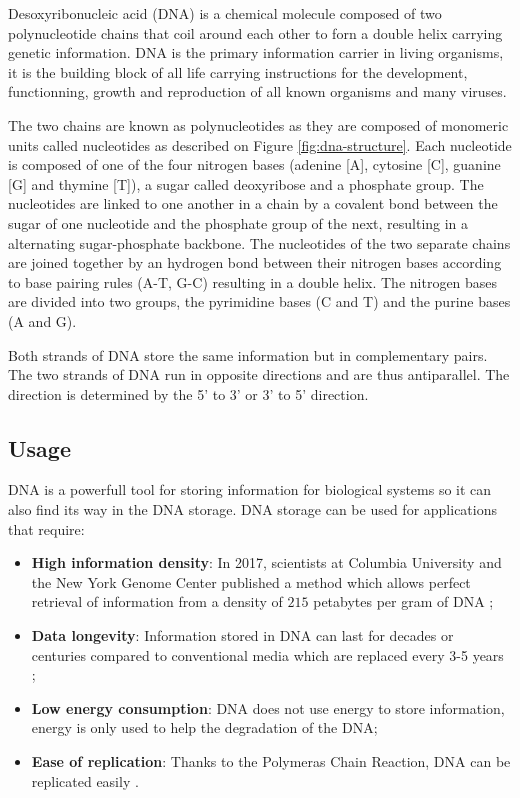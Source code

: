 Desoxyribonucleic acid (DNA) is a chemical molecule composed of two polynucleotide chains that coil around each other to forn a double helix carrying genetic information. DNA is the primary information carrier in living organisms, it is the building block of all life carrying instructions for the development, functionning, growth and reproduction of all known organisms and many viruses. 

The two chains are known as polynucleotides as they are composed of monomeric units called nucleotides as described on Figure \ref{fig:dna-structure}.
Each nucleotide is composed of one of the four nitrogen bases (adenine [A], cytosine [C], guanine [G] and thymine [T]), a sugar called deoxyribose and a phosphate group.
The nucleotides are linked to one another in a chain by a covalent bond between the sugar of one nucleotide and the phosphate group of the next, resulting in a alternating sugar-phosphate backbone.
The nucleotides of the two separate chains are joined together by an hydrogen bond between their nitrogen bases according to base pairing rules (A-T, G-C) resulting in a double helix.
The nitrogen bases are divided into two groups, the pyrimidine bases (C and T) and the purine bases (A and G).

Both strands of DNA store the same information but in complementary pairs. The two strands of DNA run in opposite directions and are thus antiparallel. The direction is determined by the 5' to 3' or 3' to 5' direction.

\subsection{Usage}

DNA is a powerfull tool for storing information for biological systems so it can also find its way in the DNA storage.
DNA storage can be used for applications that require:

\begin{itemize}
    \item \textbf{High information density}:
In 2017, scientists at Columbia University and the New York Genome Center published a method which allows perfect retrieval of information from a density of $215$ petabytes per gram of DNA \cite{bib:erlich_yaniv_2017_889697};
    \item \textbf{Data longevity}: Information stored in DNA can last for decades or centuries compared to conventional media which are replaced every 3-5 years \cite{bib:33649304};
    \item \textbf{Low energy consumption}: DNA does not use energy to store information, energy is only used to help the degradation of the DNA;
    \item \textbf{Ease of replication}: Thanks to the Polymeras Chain Reaction, DNA can be replicated easily \cite{bib:Mullis_1990}.
\end{itemize}

